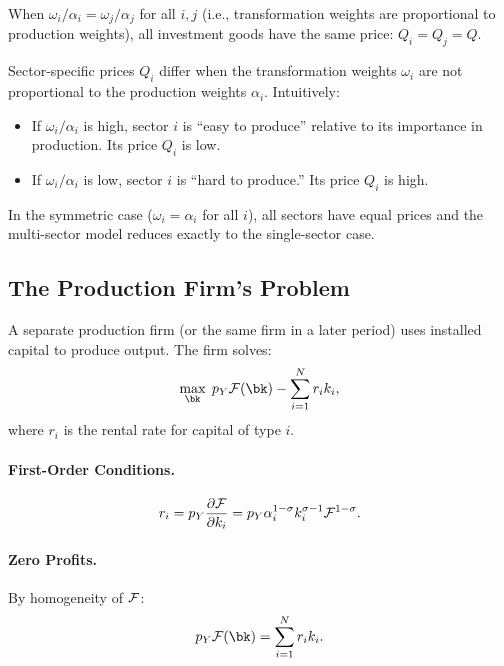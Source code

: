 When $\omega_i / \alpha_i = \omega_j / \alpha_j$ for all $i, j$ (i.e., transformation weights are proportional to production weights), all investment goods have the same price: $Q_i = Q_j = Q$.

\begin{calloutnote}
Sector-specific prices $Q_i$ differ when the transformation weights $\omega_i$ are not proportional to the production weights $\alpha_i$. Intuitively:
\begin{itemize}[nosep]
\item If $\omega_i / \alpha_i$ is high, sector $i$ is ``easy to produce'' relative to its importance in production. Its price $Q_i$ is low.
\item If $\omega_i / \alpha_i$ is low, sector $i$ is ``hard to produce.'' Its price $Q_i$ is high.
\end{itemize}

In the symmetric case ($\omega_i = \alpha_i$ for all $i$), all sectors have equal prices and the multi-sector model reduces exactly to the single-sector case.
\end{calloutnote}

\subsection{The Production Firm's Problem}
\label{subsec:ac-het-production-firm}

A separate production firm (or the same firm in a later period) uses installed capital to produce output. The firm solves:
\begin{equation}
\max_{\bk} \; p_Y \F(\bk) - \sum_{i=1}^{N} r_i k_i,
\label{eq:ac-het-prod-firm}
\end{equation}
where $r_i$ is the rental rate for capital of type $i$.

\paragraph{First-Order Conditions.}
\begin{equation}
r_i = p_Y \frac{\partial \mathcal{F}}{\partial k_i} = p_Y \alpha_i^{1-\sigma} k_i^{\sigma - 1} \mathcal{F}^{1-\sigma}.
\label{eq:ac-het-rental}
\end{equation}

\paragraph{Zero Profits.}
By homogeneity of $\mathcal{F}$:
\begin{equation}
p_Y \F(\bk) = \sum_{i=1}^{N} r_i k_i.
\label{eq:ac-het-prod-zero-profit}
\end{equation}

